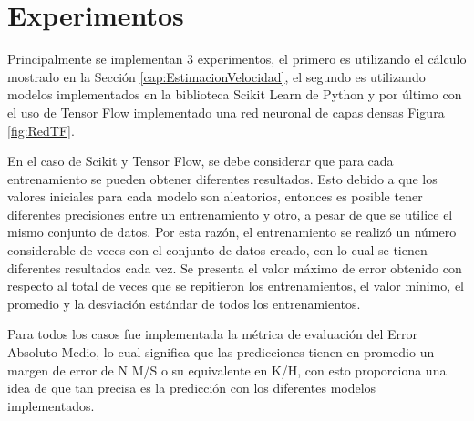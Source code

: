 \section{Experimentos}

Principalmente se implementan 3 experimentos, el primero es utilizando el cálculo mostrado en la Sección \ref{cap:EstimacionVelocidad}, el segundo es utilizando modelos implementados en la biblioteca Scikit Learn de Python y por último con el uso de Tensor Flow implementado una red neuronal de capas densas Figura \ref{fig:RedTF}.

En el caso de Scikit y Tensor Flow, se debe considerar que para cada entrenamiento se pueden obtener diferentes resultados. Esto debido a que los valores iniciales para cada modelo son aleatorios, entonces es posible tener diferentes precisiones entre un entrenamiento y otro, a pesar de que se utilice el mismo conjunto de datos. Por esta razón, el entrenamiento se realizó un número considerable de veces con el conjunto de datos creado, con lo cual se tienen diferentes resultados cada vez. Se presenta el valor máximo de error obtenido con respecto al total de veces que se repitieron los entrenamientos, el valor mínimo, el promedio y la desviación estándar de todos los entrenamientos.

Para todos los casos fue implementada la métrica de evaluación del Error Absoluto Medio, lo cual significa que las predicciones tienen en promedio un margen de error de N M/S o su equivalente en K/H, con esto proporciona una idea de que tan precisa es la predicción con los diferentes modelos implementados.

